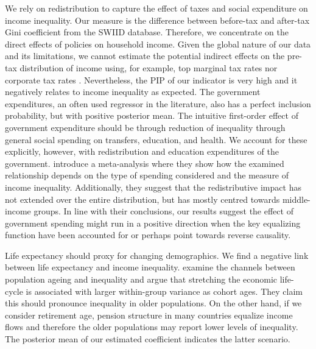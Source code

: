 \documentclass[preprint, nonatbib, 10pt]{elsarticle}
\begin{document}
  We rely on redistribution to capture the effect of taxes and social expenditure on income inequality. Our measure is the difference between before-tax and after-tax Gini coefficient from the \ac{SWIID} database. Therefore, we concentrate on the direct effects of policies on household income. Given the global nature of our data and its limitations, we cannot estimate the potential indirect effects on the pre-tax distribution of income using, for example, top marginal tax rates \parencite{alvaredoetal2013} nor corporate tax rates \parencite{fuest2018higher}. Nevertheless, the \ac{PIP} of our indicator is very high and it negatively relates to income inequality as expected. The government expenditures, an often used regressor in the literature, also has a perfect inclusion probability, but with positive posterior mean. The intuitive first-order effect of government expenditure should be through reduction of inequality through general social spending on transfers, education, and health. We account for these explicitly, however, with redistribution and education expenditures of the government. \textcite{anderson2017does} introduce a meta-analysis where they show how the examined relationship depends on the type of spending considered and the measure of income inequality. Additionally, they suggest that the redistributive impact has not extended over the entire distribution, but has mostly centred towards middle-income groups. In line with their conclusions, our results suggest the effect of government spending might run in a positive direction when the key equalizing function have been accounted for or perhaps point towards reverse causality.
  
  Life expectancy should proxy for changing demographics. We find a negative link between life expectancy and income inequality. \textcite{goldsteinlee2014} examine the channels between population ageing and inequality and argue that stretching the economic life-cycle is associated with larger within-group variance as cohort ages. They claim this should pronounce inequality in older populations. On the other hand, if we consider retirement age, pension structure in many countries equalize income flows and therefore the older populations may report lower levels of inequality. The posterior mean of our estimated coefficient indicates the latter scenario.
  
\end{document}
